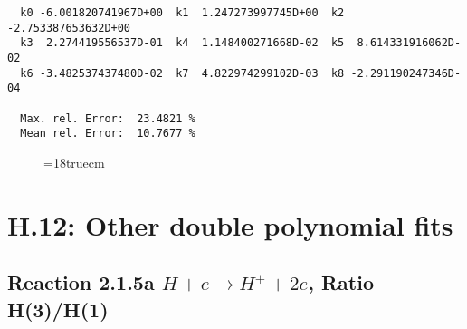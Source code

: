 \begin{verbatim}
  k0 -6.001820741967D+00  k1  1.247273997745D+00  k2 -2.753387653632D+00
  k3  2.274419556537D-01  k4  1.148400271668D-02  k5  8.614331916062D-02
  k6 -3.482537437480D-02  k7  4.822974299102D-03  k8 -2.291190247346D-04

  Max. rel. Error:  23.4821 %
  Mean rel. Error:  10.7677 %
\end{verbatim}

\begin{figure} \label{7.0}
\epsfxsize=18truecm
\end{figure}

\newpage

\section{H.12: Other double polynomial fits}

\subsection{
Reaction 2.1.5a  $H + e \rightarrow H^+ + 2e $, Ratio H(3)/H(1)
}

